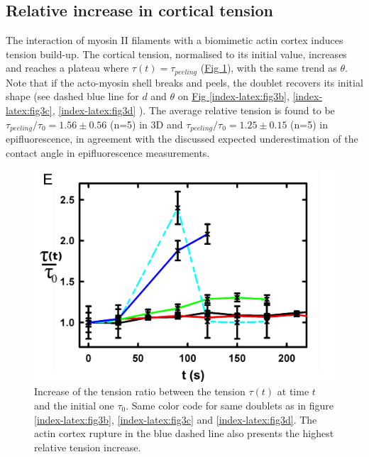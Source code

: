 \documentclass[A4paperpaper,11pt,english]{sphinxmanual}
\begin{document}
\subsection{Relative increase in cortical tension}
\label{index-latex:relative-increase-in-cortical-tension}
The interaction of myosin II filaments with a biomimetic actin cortex induces
tension build-up. The cortical tension, normalised to its initial value,
increases and reaches a plateau where \(\tau(t) = \tau_{peeling}\)
(\hyperref[index-latex:fig3e]{Fig  \ref*{index-latex:fig3e}}), with the same trend as \(\theta\).  Note that if the acto-myosin shell
breaks and peels, the doublet recovers its initial shape (see dashed blue line
for \(d\) and \(\theta\) on  \hyperref[index-latex:fig3b]{Fig  \ref*{index-latex:fig3b}}, \hyperref[index-latex:fig3c]{ \ref*{index-latex:fig3c}}, \hyperref[index-latex:fig3d]{ \ref*{index-latex:fig3d}} ). The average relative tension is found to
be \(\tau_{peeling}/\tau_0 = 1.56 \pm 0.56\) (n=5) in 3D and
\(\tau_{peeling}/\tau_0  = 1.25 \pm 0.15\) (n=5) in epifluorescence, in
agreement with the discussed expected underestimation of the contact angle in epifluorescence measurements.
\begin{figure}[htbp]
\centering
\capstart

\includegraphics[width=0.500\linewidth]{Fig_03-E.png}
\caption{Increase of the tension ratio between the tension \(\tau(t)\) at time
\(t\) and the initial one \(\tau_0\).
Same color code for same doublets as in figure \hyperref[index-latex:fig3b]{ \ref*{index-latex:fig3b}}, \hyperref[index-latex:fig3c]{ \ref*{index-latex:fig3c}}
and \hyperref[index-latex:fig3d]{ \ref*{index-latex:fig3d}}. The actin cortex rupture in the blue dashed line also presents the highest relative tension increase.}\label{index-latex:fig3e}\end{figure}
\end{document}
